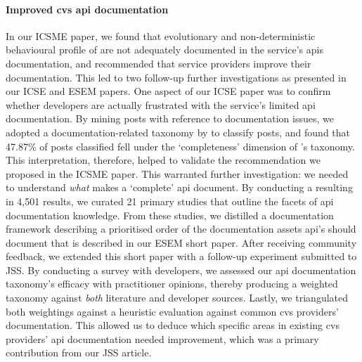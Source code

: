 \paragraph{Improved \gls{cvs} \gls{api} documentation} In our ICSME paper, we found that evolutionary and non-deterministic behavioural profile of are not adequately documented in the service's \glspl{api} documentation, and recommended that service providers improve their documentation. This led to two follow-up further investigations as presented in our ICSE and ESEM papers. One aspect of our ICSE paper was to confirm whether developers are actually frustrated with the service's limited \gls{api} documentation. By mining  posts with reference to documentation issues, we adopted a \citeyear{Aghajani:2019bo} documentation-related taxonomy by \citet{Aghajani:2018et} to classify posts, and found that 47.87\% of posts classified fell under the `completeness' dimension of \citeauthor{Aghajani:2018et}'s taxonomy. This interpretation, therefore, helped to validate the recommendation we proposed in the ICSME paper. This warranted further investigation: we needed to understand \textit{what} makes a `complete' \gls{api} document. By conducting a  resulting in 4,501 results, we curated 21 primary studies that outline the facets of \gls{api} documentation knowledge. From these studies, we distilled a documentation framework describing a prioritised order of the documentation assets \gls{api}'s should document that is described in our ESEM short paper. After receiving community feedback, we extended this short paper with a follow-up experiment submitted to JSS. By conducting a survey with developers, we assessed our \gls{api} documentation taxonomy's efficacy with practitioner opinions, thereby producing a weighted taxonomy against \textit{both} literature and developer sources. Lastly, we triangulated both weightings against a heuristic evaluation against common \gls{cvs} providers' documentation. This allowed us to deduce which specific areas in existing \gls{cvs} providers' \gls{api} documentation needed improvement, which was a primary contribution from our JSS article.

